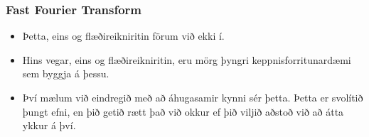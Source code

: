 \documentclass{beamer}
\begin{document}
\begin{frame}
\frametitle{Fast Fourier Transform}

\begin{itemize}

\item<1-> Þetta, eins og flæðireikniritin förum við ekki í.

\item<2-> Hins vegar, eins og flæðireikniritin, eru mörg þyngri keppnisforritunardæmi sem byggja á þessu.

\item<3-> Því mælum við eindregið með að áhugasamir kynni sér þetta. Þetta er svolítið þungt efni, en þið getið rætt það við okkur ef þið viljið aðstoð við að átta ykkur á því.

\end{itemize}

\end{frame}
\end{document}
